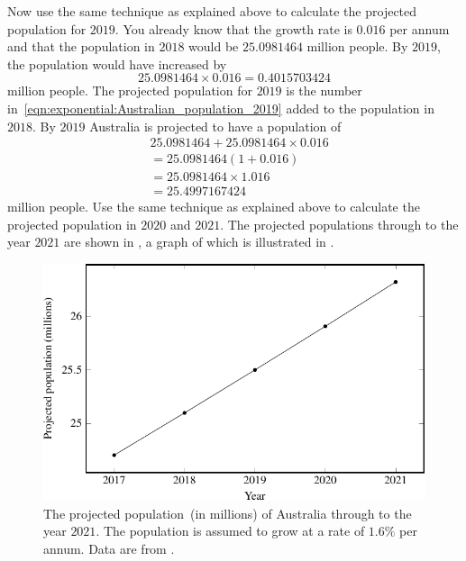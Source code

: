 \documentclass[a4paper,oneside,12pt]{article}
\begin{document}
\begin{solution}
Now use the same technique as explained above to calculate the
projected population for $2019$.  You already know that the growth
rate is $0.016$ per annum and that the population in $2018$ would be
$25.0981464$ million people.  By $2019$, the population would have
increased by
\begin{equation}
\label{eqn:exponential:Australian_population_2019}
25.0981464 \times 0.016
=
0.4015703424
\end{equation}
million people.  The projected population for $2019$ is the number
in~\eqref{eqn:exponential:Australian_population_2019} added to the
population in $2018$.  By $2019$ Australia is projected to have a
population of
\begin{align*}
&25.0981464 + 25.0981464 \times 0.016 \\[4pt]
&=
25.0981464 (1 + 0.016) \\[4pt]
&=
25.0981464 \times 1.016 \\[4pt]
&=
25.4997167424
\end{align*}
million people.  Use the same technique as explained above to
calculate the projected population in $2020$ and $2021$.  The
projected populations through to the year $2021$ are shown in
, a graph of which is
illustrated in .
\end{solution}

\begin{table}[!htbp]
\centering

\caption{%
  The projected population of Australia through to the year $2021$.
  The population numbers are in terms of millions.  For example, the
  population in $2017$ was estimated to be $24.7029$ million people.
  The population is assumed to grow at a rate of $1.6\%$ per annum.
}
\label{tab:exponential:Australian_population_2017}
\end{table}

\begin{figure}[!htbp]
\centering
\includegraphics[scale=1.1]{image/11/australian-population.pdf}
\caption{%
  The projected population~(in millions) of Australia through to the
  year $2021$.  The population is assumed to grow at a rate of $1.6\%$
  per annum.  Data are from
  .
}
\label{fig:exponential:Australian_population_2017}
\end{figure}
\end{document}
